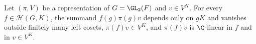 Let $(\pi,V)$ be a representation of $G=\GL_2(F)$ and $v\in V^K$. For every $f\in\mathcal H(G,K)$, the summand $f(g)\pi(g)v$ depends only on $gK$ and vanishes outside finitely many left cosets, $\pi(f)v\in V^K$, and $\pi(f)v$ is $\C$-linear in $f$ and in $v\in V^K$.
